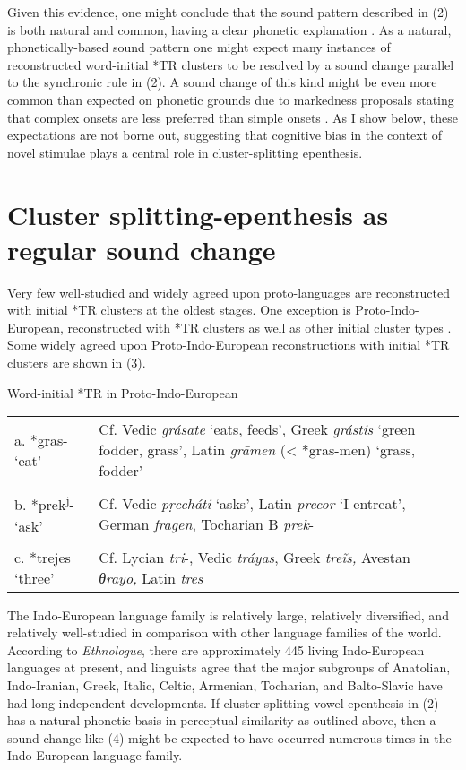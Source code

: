 \documentclass[output=paper,
modfonts
]{LSP/langsci}
\begin{document}
Given this evidence, one might conclude that the sound pattern described
in (2) is both natural and common, having a clear phonetic explanation
\citep{blevins2004, blevins2008a, blevins2015a}. As a natural, phonetically-based sound
pattern one might expect many instances of reconstructed word-initial
*TR clusters to be resolved by a sound change parallel to the synchronic
rule in (2). A sound change of this kind might be even more common than
expected on phonetic grounds due to markedness proposals stating that
complex onsets are less preferred than simple onsets \citep{prince1993a,kager1999a}. As I show below, these expectations are not
borne out, suggesting that cognitive bias in the context of novel
stimulae plays a central role in cluster-splitting epenthesis.

\section{Cluster splitting-epenthesis as regular sound change}

Very few well-studied and widely agreed upon proto-languages are
reconstructed with initial *TR clusters at the oldest stages. One
exception is Proto-Indo-European, reconstructed with *TR clusters as
well as other initial cluster types \citep[64--65]{fortson2011}. Some widely
agreed upon Proto-Indo-European reconstructions with initial *TR
clusters are shown in (3).

\begin{exe}
\ex Word-initial *TR in Proto-Indo-European \\
\begin{tabularx}{\textwidth}{lX}
a. *gras- `eat'  & Cf. Vedic \emph{grásate} `eats, feeds', Greek
\emph{grástis} `green fodder, grass', Latin \emph{grāmen} (\textless{} *gras-men) `grass, fodder' \\
& \\
b.  *prek\textsuperscript{j}- `ask' & Cf. Vedic \emph{pṛccháti} `asks',
Latin \emph{precor} `I entreat', German \emph{fragen}, Tocharian B \emph{prek}- \\
&\\
c. *trejes `three' & Cf. Lycian \emph{tri}-, Vedic \emph{tráyas}, Greek
\emph{treĩs,} Avestan \emph{θrayō,} Latin \emph{trēs} \\
\end{tabularx}
\end{exe}

The Indo-European language family is relatively large, relatively
diversified, and relatively well-studied in comparison with other
language families of the world. According to \emph{Ethnologue}, there
are approximately 445 living Indo-European languages at present, and
linguists agree that the major subgroups of Anatolian, Indo-Iranian,
Greek, Italic, Celtic, Armenian, Tocharian, and Balto-Slavic have had
long independent developments. If cluster-splitting vowel-epenthesis in
(2) has a natural phonetic basis in perceptual similarity as outlined
above, then a sound change like (4) might be expected to have occurred
numerous times in the Indo-European language family.
\end{document}
